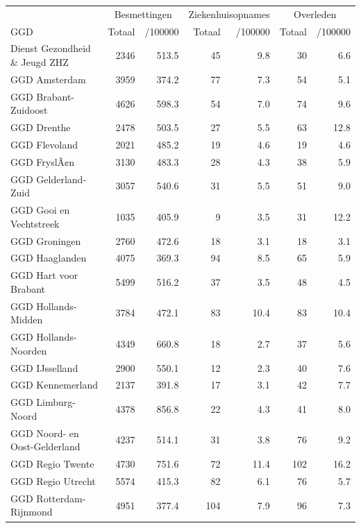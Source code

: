 \documentclass[
  english,
  man,floatsintext]{apa6}
\begin{document}
\begin{table}[H]
\centering\begingroup\fontsize{10}{12}\selectfont

\begin{threeparttable}
\begin{tabular}{lrrrrrr}
\toprule
\multicolumn{1}{c}{ } & \multicolumn{2}{c}{Besmettingen} & \multicolumn{2}{c}{Ziekenhuisopnames} & \multicolumn{2}{c}{Overleden} \\
\cmidrule(l{3pt}r{3pt}){2-3} \cmidrule(l{3pt}r{3pt}){4-5} \cmidrule(l{3pt}r{3pt}){6-7}
GGD & Totaal & /100000 & Totaal & /100000 & Totaal & /100000\\
\midrule
Dienst Gezondheid \& Jeugd ZHZ & 2346 & 513.5 & 45 & 9.8 & 30 & 6.6\\
GGD Amsterdam & 3959 & 374.2 & 77 & 7.3 & 54 & 5.1\\
GGD Brabant-Zuidoost & 4626 & 598.3 & 54 & 7.0 & 74 & 9.6\\
GGD Drenthe & 2478 & 503.5 & 27 & 5.5 & 63 & 12.8\\
GGD Flevoland & 2021 & 485.2 & 19 & 4.6 & 19 & 4.6\\
GGD FryslÃ¢n & 3130 & 483.3 & 28 & 4.3 & 38 & 5.9\\
GGD Gelderland-Zuid & 3057 & 540.6 & 31 & 5.5 & 51 & 9.0\\
GGD Gooi en Vechtstreek & 1035 & 405.9 & 9 & 3.5 & 31 & 12.2\\
GGD Groningen & 2760 & 472.6 & 18 & 3.1 & 18 & 3.1\\
GGD Haaglanden & 4075 & 369.3 & 94 & 8.5 & 65 & 5.9\\
GGD Hart voor Brabant & 5499 & 516.2 & 37 & 3.5 & 48 & 4.5\\
GGD Hollands-Midden & 3784 & 472.1 & 83 & 10.4 & 83 & 10.4\\
GGD Hollands-Noorden & 4349 & 660.8 & 18 & 2.7 & 37 & 5.6\\
GGD IJsselland & 2900 & 550.1 & 12 & 2.3 & 40 & 7.6\\
GGD Kennemerland & 2137 & 391.8 & 17 & 3.1 & 42 & 7.7\\
GGD Limburg-Noord & 4378 & 856.8 & 22 & 4.3 & 41 & 8.0\\
GGD Noord- en Oost-Gelderland & 4237 & 514.1 & 31 & 3.8 & 76 & 9.2\\
GGD Regio Twente & 4730 & 751.6 & 72 & 11.4 & 102 & 16.2\\
GGD Regio Utrecht & 5574 & 415.3 & 82 & 6.1 & 76 & 5.7\\
GGD Rotterdam-Rijnmond & 4951 & 377.4 & 104 & 7.9 & 96 & 7.3\\

\end{tabular}
\end{threeparttable}
\end{table}
\end{document}
